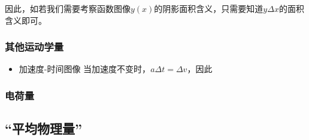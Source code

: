 因此，如若我们需要考察函数图像$y(x)$的阴影面积含义，只需要知道$y\Delta x$的面积含义即可。
\subsubsection{其他运动学量}
\begin{itemize}
\item 加速度-时间图像 当加速度不变时，$a\Delta t=\Delta v$，因此
\end{itemize}

\subsubsection{电荷量}
\subsection{“平均物理量”}
